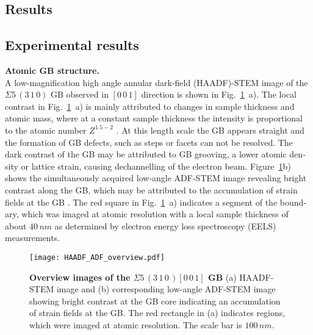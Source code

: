 \documentclass[12pt,a4paper,twoside,twocolumn,english,english]{article}
\begin{document}
\begin{otherlanguage}{english}
 
\section*{Results}
\subsection*{Experimental results}
\textbf{Atomic GB structure.}\\ A low-magnification high angle annular dark-field (HAADF)-STEM image of the $\Sigma 5\,(3\,1\,0)$ GB observed in $[0\,0\,1]$ direction is shown in Fig.~\ref{haadf_adf_overview}~a). The local contrast in Fig.~\ref{haadf_adf_overview}~a) is mainly attributed to changes in sample thickness and atomic mass, where at a constant sample thickness the intensity is proportional to the atomic number $Z^{1.5-2}$ \cite{pennycook_scanning_2011-1}. At this length scale the GB appears straight and the formation of GB defects, such as steps or facets can not be resolved. The dark contrast of the GB may be attributed to GB grooving, a lower atomic density or lattice strain, causing dechannelling of the electron beam. Figure~\ref{haadf_adf_overview}b) shows the simultaneously acquired low-angle ADF-STEM image revealing bright contrast along the GB, which may be attributed to the accumulation of strain fields at the GB \cite{liebscher_strain-induced_2018-1}. The red square in Fig.~\ref{haadf_adf_overview}~a) indicates a segment of the boundary, which was imaged at atomic resolution with a local sample thickness of about $40\,nm$ as determined by electron energy loss spectroscopy (EELS) measurements.

\begin{figure}[ht]
  \centering
\texttt{[image: HAADF\_ADF\_overview.pdf]}
\caption{\textbf{Overview images of the $\Sigma 5\,(3\,1\,0\,) [0\,0\,1]$ GB} (a) HAADF-STEM image and (b) corresponding low-angle ADF-STEM image showing bright contrast at the GB core indicating an accumulation of strain fields at the GB. The red rectangle in (a) indicates regions, which were imaged at atomic resolution. The scale bar is $100\,nm$.}
\label{haadf_adf_overview}
\end{figure}


\end{otherlanguage}
\end{document}
